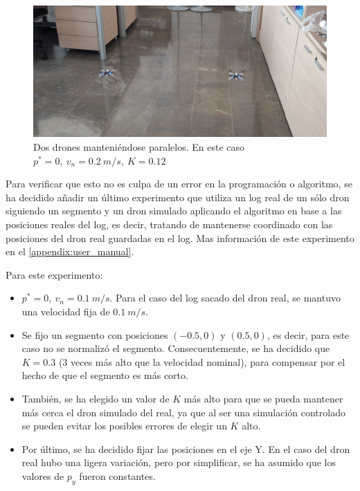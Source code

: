 \begin{figure}[h]
    \centering
    \includegraphics[width=\textwidth]{img/fig/fig4.7-coordinated-crazyflies.jpg}
    \caption{Dos drones manteniéndose paralelos. 
    En este caso $p^* = 0, \ v_n = 0.2 \ m/s, \ K = 0.12$}
    \label{fig:coordinated-crazyflies}
\end{figure}

Para verificar que esto no es culpa de un error en la programación o algoritmo,
se ha decidido añadir un último experimento que utiliza un log real de un sólo dron siguiendo un segmento y 
un dron simulado aplicando el algoritmo en base a las posiciones reales del log, 
es decir, tratando de mantenerse coordinado con las posiciones del dron real guardadas en el log.
Mas información de este experimento en el \autoref{appendix:user_manual}.

Para este experimento:

\begin{itemize}
    \item $p^* = 0, \ v_n = 0.1 \ m/s$. 
    Para el caso del log sacado del dron real, se mantuvo una velocidad fija de $0.1 \ m/s$.
    \item Se fijo un segmento con posiciones $(-0.5, 0)$ y $(0.5, 0)$, es decir,
    para este caso no se normalizó el segmento. 
    Consecuentemente,  se ha decidido que $K = 0.3$ (3 veces más alto que la velocidad nominal), 
    para compensar por el hecho de que el segmento es más corto. 
    \item También, se ha elegido un valor de $K$ más alto para que se pueda mantener más cerca el dron simulado del real, ya que al ser una simulación controlado se pueden evitar los posibles errores de elegir un $K$ alto.
    \item Por último, se ha decidido fijar las posiciones en el eje Y. 
    En el caso del dron real hubo una ligera variación, pero por simplificar, se ha asumido que los valores de $p_y$ fueron constantes.
\end{itemize}

